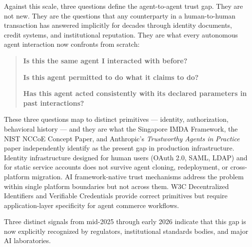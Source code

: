 Against this scale, three questions define the agent-to-agent trust gap. They are not new. They are the questions that any counterparty in a human-to-human transaction has answered implicitly for decades through identity documents, credit systems, and institutional reputation. They are what every autonomous agent interaction now confronts from scratch:


\begin{quote}
\textbf{Is this the same agent I interacted with before?}

\textbf{Is this agent permitted to do what it claims to do?}

\textbf{Has this agent acted consistently with its declared parameters in past interactions?}

\end{quote}

These three questions map to distinct primitives — identity, authorization, behavioral history — and they are what the Singapore IMDA Framework, the NIST NCCoE Concept Paper, and Anthropic's \textit{Trustworthy Agents in Practice} paper independently identify as the present gap in production infrastructure. Identity infrastructure designed for human users (OAuth 2.0, SAML, LDAP) and for static service accounts does not survive agent cloning, redeployment, or cross-platform migration. AI framework-native trust mechanisms address the problem within single platform boundaries but not across them. W3C Decentralized Identifiers and Verifiable Credentials provide correct primitives \cite{ref6_w3cdid,ref7_w3cvc} but require application-layer specificity for agent commerce workflows.


Three distinct signals from mid-2025 through early 2026 indicate that this gap is now explicitly recognized by regulators, institutional standards bodies, and major AI laboratories.


